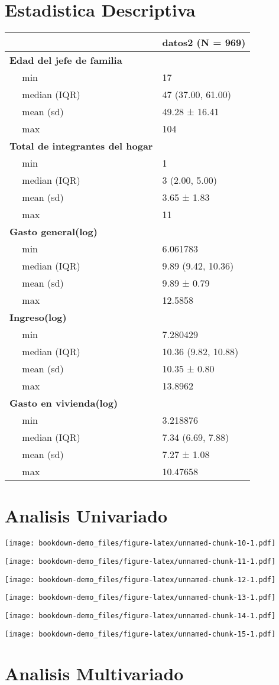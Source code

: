 \documentclass[]{book}
\begin{document}
\section{Estadistica Descriptiva}\label{estadistica-descriptiva}

\begin{longtable}[]{@{}ll@{}}
\toprule
& datos2 (N = 969)\tabularnewline
\midrule
\endhead
\textbf{Edad del jefe de familia} & ~~\tabularnewline
~~ min & 17\tabularnewline
~~ median (IQR) & 47 (37.00, 61.00)\tabularnewline
~~ mean (sd) & 49.28 ± 16.41\tabularnewline
~~ max & 104\tabularnewline
\textbf{Total de integrantes del hogar} & ~~\tabularnewline
~~ min & 1\tabularnewline
~~ median (IQR) & 3 (2.00, 5.00)\tabularnewline
~~ mean (sd) & 3.65 ± 1.83\tabularnewline
~~ max & 11\tabularnewline
\textbf{Gasto general(log)} & ~~\tabularnewline
~~ min & 6.061783\tabularnewline
~~ median (IQR) & 9.89 (9.42, 10.36)\tabularnewline
~~ mean (sd) & 9.89 ± 0.79\tabularnewline
~~ max & 12.5858\tabularnewline
\textbf{Ingreso(log)} & ~~\tabularnewline
~~ min & 7.280429\tabularnewline
~~ median (IQR) & 10.36 (9.82, 10.88)\tabularnewline
~~ mean (sd) & 10.35 ± 0.80\tabularnewline
~~ max & 13.8962\tabularnewline
\textbf{Gasto en vivienda(log)} & ~~\tabularnewline
~~ min & 3.218876\tabularnewline
~~ median (IQR) & 7.34 (6.69, 7.88)\tabularnewline
~~ mean (sd) & 7.27 ± 1.08\tabularnewline
~~ max & 10.47658\tabularnewline
\bottomrule
\end{longtable}

\section{Analisis Univariado}\label{analisis-univariado}

\texttt{[image: bookdown-demo\_files/figure-latex/unnamed-chunk-10-1.pdf]}

\texttt{[image: bookdown-demo\_files/figure-latex/unnamed-chunk-11-1.pdf]}

\texttt{[image: bookdown-demo\_files/figure-latex/unnamed-chunk-12-1.pdf]}

\texttt{[image: bookdown-demo\_files/figure-latex/unnamed-chunk-13-1.pdf]}

\texttt{[image: bookdown-demo\_files/figure-latex/unnamed-chunk-14-1.pdf]}

\texttt{[image: bookdown-demo\_files/figure-latex/unnamed-chunk-15-1.pdf]}

\section{Analisis Multivariado}\label{analisis-multivariado}
\end{document}
